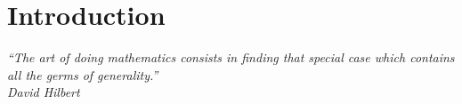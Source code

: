 \chapter{Introduction}
\textit{“The art of doing mathematics consists in finding that special case which contains all the germs of generality.”}
\\
\textit{David Hilbert}
